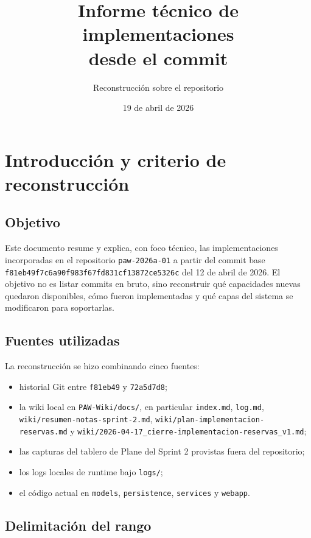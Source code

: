 \documentclass[11pt,a4paper]{report}
\title{
  \Huge Informe t\'ecnico de implementaciones\\[0.4em]
  \Large desde el commit \commit{f81eb49f7c6a90f983f67fd831cf13872ce5326c}
}
\author{Reconstrucci\'on sobre el repositorio \code{paw-2026a-01}}
\date{19 de abril de 2026}
\newcommand{\commit}[1]{\texttt{#1}}
\newcommand{\code}[1]{\nolinkurl{#1}}
\begin{document}
\maketitle
\clearpage
{}
\tableofcontents
\clearpage
{}

\chapter{Introducci\'on y criterio de reconstrucci\'on}

\section{Objetivo}

Este documento resume y explica, con foco t\'ecnico, las implementaciones incorporadas en el repositorio \code{paw-2026a-01} a partir del commit base \commit{f81eb49f7c6a90f983f67fd831cf13872ce5326c} del 12 de abril de 2026. El objetivo no es listar commits en bruto, sino reconstruir qu\'e capacidades nuevas quedaron disponibles, c\'omo fueron implementadas y qu\'e capas del sistema se modificaron para soportarlas.

\section{Fuentes utilizadas}

La reconstrucci\'on se hizo combinando cinco fuentes:

\begin{itemize}
  \item historial Git entre \commit{f81eb49} y \commit{72a5d7d8};
  \item la wiki local en \code{PAW-Wiki/docs/}, en particular \code{index.md}, \code{log.md}, \code{wiki/resumen-notas-sprint-2.md}, \code{wiki/plan-implementacion-reservas.md} y \code{wiki/2026-04-17_cierre-implementacion-reservas_v1.md};
  \item las capturas del tablero de Plane del Sprint 2 provistas fuera del repositorio;
  \item los logs locales de runtime bajo \code{logs/};
  \item el c\'odigo actual en \code{models}, \code{persistence}, \code{services} y \code{webapp}.
\end{itemize}

\section{Delimitaci\'on del rango}
\end{document}
